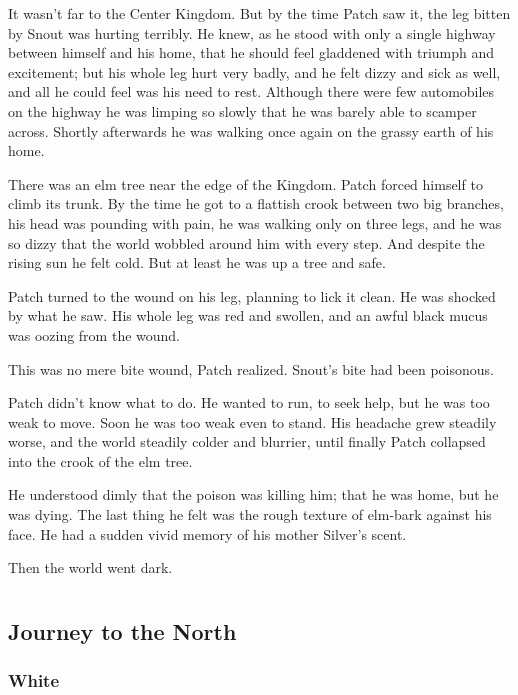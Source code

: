 \documentclass[12pt]{memoir}
\begin{document}
It wasn’t far to the Center Kingdom. But by the time Patch saw it, the
leg bitten by Snout was hurting terribly. He knew, as he stood with
only a single highway between himself and his home, that he should
feel gladdened with triumph and excitement; but his whole leg hurt
very badly, and he felt dizzy and sick as well, and all he could feel
was his need to rest. Although there were few automobiles on the
highway he was limping so slowly that he was barely able to scamper
across. Shortly afterwards he was walking once again on the grassy
earth of his home.

There was an elm tree near the edge of the Kingdom. Patch forced
himself to climb its trunk. By the time he got to a flattish crook
between two big branches, his head was pounding with pain, he was
walking only on three legs, and he was so dizzy that the world wobbled
around him with every step. And despite the rising sun he felt
cold. But at least he was up a tree and safe.

Patch turned to the wound on his leg, planning to lick it clean. He
was shocked by what he saw. His whole leg was red and swollen, and an
awful black mucus was oozing from the wound.

This was no mere bite wound, Patch realized. Snout’s bite had been
poisonous.

Patch didn’t know what to do. He wanted to run, to seek help, but he
was too weak to move. Soon he was too weak even to stand. His headache
grew steadily worse, and the world steadily colder and blurrier, until
finally Patch collapsed into the crook of the elm tree.

He understood dimly that the poison was killing him; that he was home,
but he was dying. The last thing he felt was the rough texture of
elm-bark against his face. He had a sudden vivid memory of his mother
Silver’s scent.

Then the world went dark.


\part{}

\chapter{Journey to the North}

\section{White}
\end{document}
